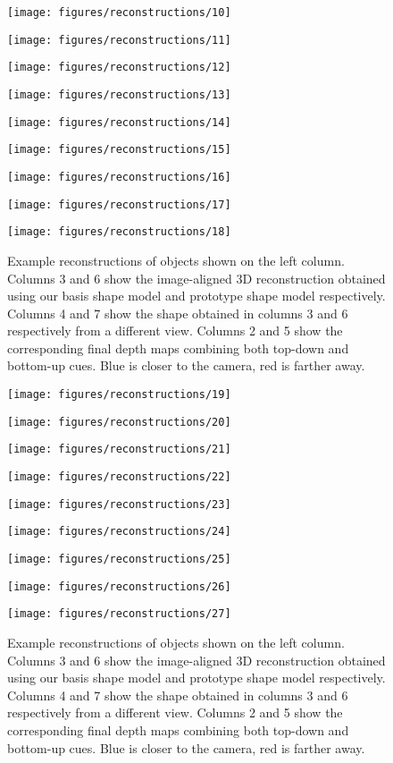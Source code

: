 \documentclass[runningheads]{llncs}
\begin{document}
\begin{figure}[htb!]
  \texttt{[image: figures/reconstructions/10]}
  
\texttt{[image: figures/reconstructions/11]}

\texttt{[image: figures/reconstructions/12]}

 \texttt{[image: figures/reconstructions/13]}
  
 \texttt{[image: figures/reconstructions/14]}

\texttt{[image: figures/reconstructions/15]}

 \texttt{[image: figures/reconstructions/16]}

\texttt{[image: figures/reconstructions/17]}

\texttt{[image: figures/reconstructions/18]}

\caption{\label{fig:recons2}Example reconstructions of objects shown on the left column. Columns 3 and 6  show the image-aligned 3D reconstruction obtained using our basis shape model and prototype shape model respectively. Columns 4 and 7 show the shape obtained in  columns 3 and 6 respectively from a different view. Columns 2 and 5 show the corresponding final depth maps combining both top-down and bottom-up cues. Blue is closer to the camera, red is farther away.}

\end{figure}

\begin{figure}[htb!]

\texttt{[image: figures/reconstructions/19]}

\texttt{[image: figures/reconstructions/20]}

\texttt{[image: figures/reconstructions/21]}

\texttt{[image: figures/reconstructions/22]}

\texttt{[image: figures/reconstructions/23]}

\texttt{[image: figures/reconstructions/24]}

\texttt{[image: figures/reconstructions/25]}

\texttt{[image: figures/reconstructions/26]}

\texttt{[image: figures/reconstructions/27]}

\caption{\label{fig:recons3}Example reconstructions of objects shown on the left column. Columns 3 and 6  show the image-aligned 3D reconstruction obtained using our basis shape model and prototype shape model respectively. Columns 4 and 7 show the shape obtained in  columns 3 and 6 respectively from a different view. Columns 2 and 5 show the corresponding final depth maps combining both top-down and bottom-up cues. Blue is closer to the camera, red is farther away.}
\end{figure}



\end{document}
